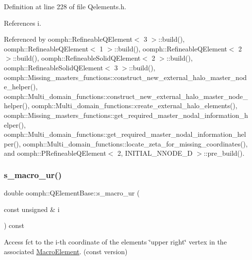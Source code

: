 Definition at line 228 of file Qelements.\+h.



References i.



Referenced by oomph\+::\+Refineable\+Q\+Element$<$ 3 $>$\+::build(), oomph\+::\+Refineable\+Q\+Element$<$ 1 $>$\+::build(), oomph\+::\+Refineable\+Q\+Element$<$ 2 $>$\+::build(), oomph\+::\+Refineable\+Solid\+Q\+Element$<$ 2 $>$\+::build(), oomph\+::\+Refineable\+Solid\+Q\+Element$<$ 3 $>$\+::build(), oomph\+::\+Missing\+\_\+masters\+\_\+functions\+::construct\+\_\+new\+\_\+external\+\_\+halo\+\_\+master\+\_\+node\+\_\+helper(), oomph\+::\+Multi\+\_\+domain\+\_\+functions\+::construct\+\_\+new\+\_\+external\+\_\+halo\+\_\+master\+\_\+node\+\_\+helper(), oomph\+::\+Multi\+\_\+domain\+\_\+functions\+::create\+\_\+external\+\_\+halo\+\_\+elements(), oomph\+::\+Missing\+\_\+masters\+\_\+functions\+::get\+\_\+required\+\_\+master\+\_\+nodal\+\_\+information\+\_\+helper(), oomph\+::\+Multi\+\_\+domain\+\_\+functions\+::get\+\_\+required\+\_\+master\+\_\+nodal\+\_\+information\+\_\+helper(), oomph\+::\+Multi\+\_\+domain\+\_\+functions\+::locate\+\_\+zeta\+\_\+for\+\_\+missing\+\_\+coordinates(), and oomph\+::\+P\+Refineable\+Q\+Element$<$ 2, I\+N\+I\+T\+I\+A\+L\+\_\+\+N\+N\+O\+D\+E\+\_\+D $>$\+::pre\+\_\+build().

\mbox{\label{classoomph_1_1QElementBase_ad761688aa29832c214b439db278625f2}} 
\subsubsection{\texorpdfstring{s\+\_\+macro\+\_\+ur()}{s\_macro\_ur()}\hspace{0.1cm}{\footnotesize\ttfamily [2/2]}}
{\footnotesize\ttfamily double oomph\+::\+Q\+Element\+Base\+::s\+\_\+macro\+\_\+ur (\begin{DoxyParamCaption}\item[{const unsigned \&}]{i }\end{DoxyParamCaption}) const\hspace{0.3cm}{\ttfamily [inline]}}



Access fct to the i-\/th coordinate of the element\textquotesingle{}s \char`\"{}upper right\char`\"{} vertex in the associated \hyperlink{classoomph_1_1MacroElement}{Macro\+Element}. (const version) 



